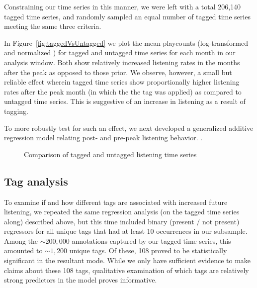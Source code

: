 Constraining our time series in this manner, we were left with a total 206,140 tagged time series, and randomly sampled an equal number of tagged time series meeting the same three criteria.

In Figure~\ref{fig:taggedVsUntagged} we plot the mean playcounts (log-transformed and normalized ) for tagged and untagged time series for each month in our analysis window. Both show relatively increased listening rates in the months after the peak as opposed to those prior. We observe, however, a small but reliable  effect wherein tagged time series show proportionally higher listening rates after the peak month (in which the the tag was applied) as compared to untagged time series. This is suggestive of an increase in listening as a result of tagging.

To more robustly test for such an effect, we next developed a generalized additive regression model relating post- and pre-peak listening behavior. .


  \begin{figure}
    \hfill
    \caption{Comparison of tagged and untagged listening time series}
    \label{fig:dummy}
  \end{figure}

\subsection{Tag analysis}
To examine if and how different tags are associated with increased future listening, we repeated the same regression analysis (on the tagged time series along) described above, but this time included binary (present / not present) regressors for all unique tags that had at least 10 occurrences in our subsample. Among the $\sim200,000$ annotations captured by our tagged time series, this amounted to $\sim1,200$ unique tags. Of these, 108 proved to be statistically significant  in the resultant mode. While we only have sufficient evidence to make claims about these 108 tags, qualitative examination of which tags are relatively strong predictors in the model proves informative. 

